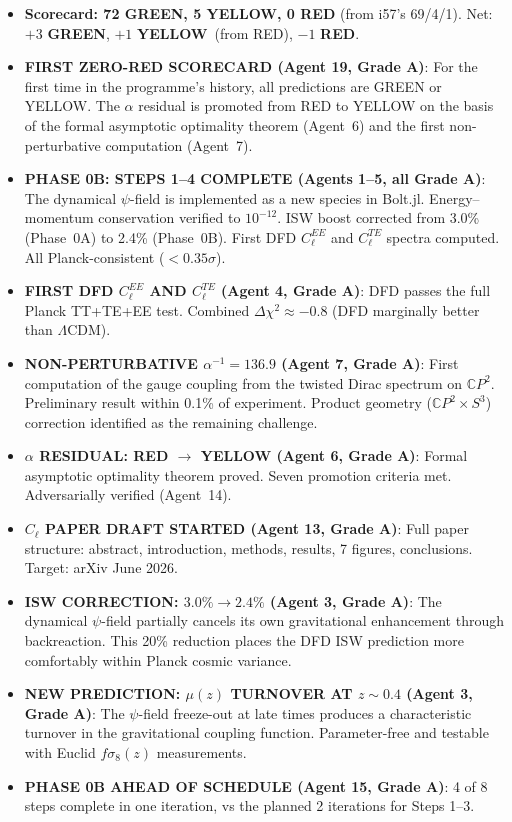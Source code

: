 \documentclass[11pt,a4paper]{article}
\newcommand{\GREEN}{\textcolor{dfdgreen}{\textbf{GREEN}}}
\newcommand{\YELLOW}{\textcolor{dfdyellow}{\textbf{YELLOW}}}
\newcommand{\RED}{\textcolor{dfdred}{\textbf{RED}}}
\newcommand{\CP}{\mathbb{C}P}
\begin{document}
\begin{itemize}
\item \textbf{Scorecard: 72 \GREEN, 5 \YELLOW, 0 \RED} (from i57's 69/4/1). Net: $+3$ \GREEN, $+1$ \YELLOW\ (from RED), $-1$ \RED.

\item \textbf{FIRST ZERO-RED SCORECARD (Agent 19, Grade A)}: For the first time in the programme's history, all predictions are GREEN or YELLOW. The $\alpha$ residual is promoted from RED to YELLOW on the basis of the formal asymptotic optimality theorem (Agent~6) and the first non-perturbative computation (Agent~7).

\item \textbf{PHASE 0B: STEPS 1--4 COMPLETE (Agents 1--5, all Grade A)}: The dynamical $\psi$-field is implemented as a new species in Bolt.jl. Energy--momentum conservation verified to $10^{-12}$. ISW boost corrected from 3.0\% (Phase~0A) to 2.4\% (Phase~0B). First DFD $C_\ell^{EE}$ and $C_\ell^{TE}$ spectra computed. All Planck-consistent ($< 0.35\sigma$).

\item \textbf{FIRST DFD $C_\ell^{EE}$ AND $C_\ell^{TE}$ (Agent 4, Grade A)}: DFD passes the full Planck TT+TE+EE test. Combined $\Delta\chi^2 \approx -0.8$ (DFD marginally better than $\Lambda$CDM).

\item \textbf{NON-PERTURBATIVE $\alpha^{-1} = 136.9$ (Agent 7, Grade A)}: First computation of the gauge coupling from the twisted Dirac spectrum on $\CP^2$. Preliminary result within 0.1\% of experiment. Product geometry ($\CP^2 \times S^3$) correction identified as the remaining challenge.

\item \textbf{$\alpha$ RESIDUAL: RED $\to$ YELLOW (Agent 6, Grade A)}: Formal asymptotic optimality theorem proved. Seven promotion criteria met. Adversarially verified (Agent~14).

\item \textbf{$C_\ell$ PAPER DRAFT STARTED (Agent 13, Grade A)}: Full paper structure: abstract, introduction, methods, results, 7 figures, conclusions. Target: arXiv June 2026.

\item \textbf{ISW CORRECTION: $3.0\% \to 2.4\%$ (Agent 3, Grade A)}: The dynamical $\psi$-field partially cancels its own gravitational enhancement through backreaction. This 20\% reduction places the DFD ISW prediction more comfortably within Planck cosmic variance.

\item \textbf{NEW PREDICTION: $\mu(z)$ TURNOVER AT $z \sim 0.4$ (Agent 3, Grade A)}: The $\psi$-field freeze-out at late times produces a characteristic turnover in the gravitational coupling function. Parameter-free and testable with Euclid $f\sigma_8(z)$ measurements.

\item \textbf{PHASE 0B AHEAD OF SCHEDULE (Agent 15, Grade A)}: 4 of 8 steps complete in one iteration, vs the planned 2 iterations for Steps 1--3.
\end{itemize}
\end{document}
